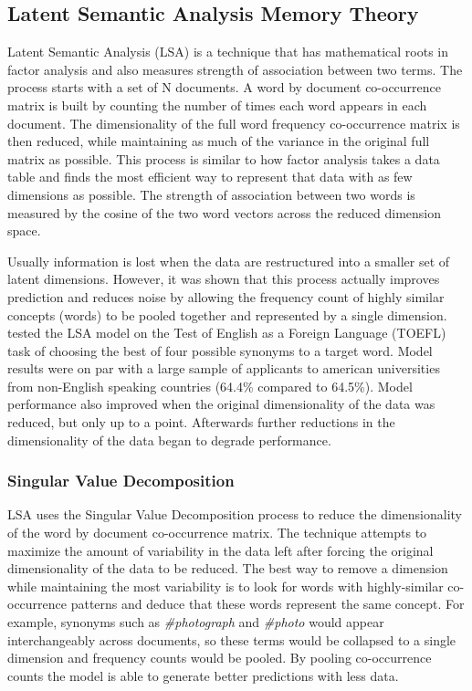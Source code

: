\documentclass[man,floatsintext,donotrepeattitle]{apa6}
\begin{document}
\subsection{Latent Semantic Analysis Memory Theory}

Latent Semantic Analysis \parencite{Landauer1997} (LSA) is a technique that has mathematical roots in factor analysis and also measures strength of association between two terms.
The process starts with a set of N documents.
A word by document co-occurrence matrix is built by counting the number of times each word appears in each document.
The dimensionality of the full word frequency co-occurrence matrix is then reduced, while maintaining as much of the variance in the original full matrix as possible.
This process is similar to how factor analysis takes a data table and finds the most efficient way to represent that data with as few dimensions as possible.
The strength of association between two words is measured by the cosine of the two word vectors across the reduced dimension space.

Usually information is lost when the data are restructured into a smaller set of latent dimensions.
However, it was shown that this process actually improves prediction and reduces noise by allowing the frequency count of highly similar concepts (words) to be pooled together and represented by a single dimension.
\textcite{Landauer1997} tested the LSA model on the Test of English as a Foreign Language (TOEFL) task of choosing the best of four possible synonyms to a target word.
Model results were on par with a large sample of applicants to american universities from non-English speaking countries (64.4\% compared to 64.5\%).
Model performance also improved when the original dimensionality of the data was reduced, but only up to a point.
Afterwards further reductions in the dimensionality of the data began to degrade performance.

\subsubsection{Singular Value Decomposition}

LSA uses the Singular Value Decomposition process to reduce the dimensionality of the word by document co-occurrence matrix.
The technique attempts to maximize the amount of variability in the data left after forcing the original dimensionality of the data to be reduced.
The best way to remove a dimension while maintaining the most variability is to look for words with highly-similar co-occurrence patterns and deduce that these words represent the same concept.
For example, synonyms such as \emph{\#photograph} and \emph{\#photo} would appear interchangeably across documents, so these terms would be collapsed to a single dimension and frequency counts would be pooled.
By pooling co-occurrence counts the model is able to generate better predictions with less data.
\end{document}
